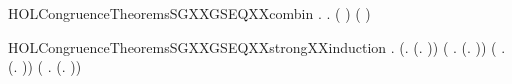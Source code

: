\newcommand{\HOLCongruenceTheoremsSGXXcases}{\UseVerbatim{HOLCongruenceTheoremsSGXXcases}}
\begin{SaveVerbatim}{HOLCongruenceTheoremsSGXXGSEQXXcombin}
\HOLTokenTurnstile{} \HOLSymConst{\HOLTokenForall{}}.   \HOLSymConst{\HOLTokenConj{}}   \HOLSymConst{\HOLTokenImp{}} \HOLSymConst{\HOLTokenForall{}}.   \HOLSymConst{\HOLTokenImp{}}  ( \HOLConst{\HOLTokenCompose} ) \HOLSymConst{\HOLTokenConj{}}  ( \HOLConst{\HOLTokenCompose} )
\end{SaveVerbatim}
\newcommand{\HOLCongruenceTheoremsSGXXGSEQXXcombin}{\UseVerbatim{HOLCongruenceTheoremsSGXXGSEQXXcombin}}
\begin{SaveVerbatim}{HOLCongruenceTheoremsSGXXGSEQXXstrongXXinduction}
\HOLTokenTurnstile{} \HOLSymConst{\HOLTokenForall{}}.
       (\HOLSymConst{\HOLTokenForall{}}.  (\HOLTokenLambda{}. )) \HOLSymConst{\HOLTokenConj{}} (\HOLSymConst{\HOLTokenForall{}} .   \HOLSymConst{\HOLTokenImp{}}  (\HOLTokenLambda{}.   )) \HOLSymConst{\HOLTokenConj{}}
       (\HOLSymConst{\HOLTokenForall{}} .   \HOLSymConst{\HOLTokenConj{}}   \HOLSymConst{\HOLTokenConj{}}   \HOLSymConst{\HOLTokenImp{}}  (\HOLTokenLambda{}.  )) \HOLSymConst{\HOLTokenConj{}}
       (\HOLSymConst{\HOLTokenForall{}} .
              \HOLSymConst{\HOLTokenConj{}}   \HOLSymConst{\HOLTokenConj{}}   \HOLSymConst{\HOLTokenConj{}}   \HOLSymConst{\HOLTokenConj{}}   \HOLSymConst{\HOLTokenConj{}}   \HOLSymConst{\HOLTokenImp{}}
             (\HOLTokenLambda{}. \HOLConst{\ensuremath{\tau}}  \HOLSymConst{\ensuremath{+}} \HOLConst{\ensuremath{\tau}} )) \HOLSymConst{\HOLTokenConj{}}

\end{SaveVerbatim}
